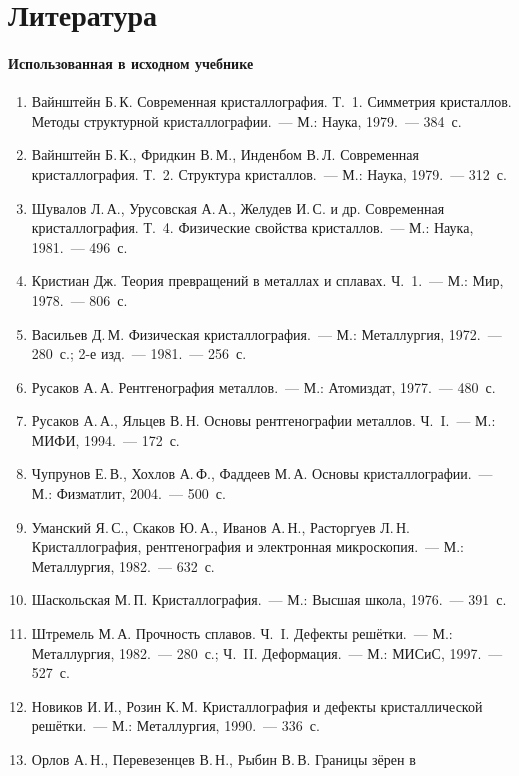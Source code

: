 \section*{Литература}

{\small
\paragraph{Использованная в исходном учебнике}
\begin{enumerate}[label=\arabic*.]
\item Вайнштейн Б.\,К. Современная кристаллография. Т.~1. Симметрия
кристаллов. Методы структурной кристаллографии.~— М.: Наука, 1979.~— 384~с.
\item Вайнштейн Б.\,К., Фридкин В.\,М., Инденбом В.\,Л. Современная
кристаллография. Т.~2. Структура кристаллов.~— М.: Наука, 1979.~— 312~с.
\item Шувалов Л.\,А., Урусовская А.\,А., Желудев И.\,С. и др. Современная
кристаллография. Т.~4. Физические свойства кристаллов.~— М.: Наука,
1981.~— 496~с.
\item Кристиан Дж. Теория превращений в металлах и сплавах. Ч.~1.~— М.:
Мир, 1978.~— 806~с.
\item Васильев Д.\,М. Физическая кристаллография.~— М.: Металлургия,
1972.~— 280~с.; 2-е изд.~— 1981.~— 256~с.
\item Русаков А.\,А. Рентгенография металлов.~— М.: Атомиздат, 1977.~— 480~с.
\item Русаков А.\,А., Яльцев В.\,Н. Основы рентгенографии металлов. Ч.~I.~—
М.: МИФИ, 1994.~— 172~с.
\item Чупрунов Е.\,В., Хохлов А.\,Ф., Фаддеев М.\,А. Основы
кристаллографии.~— М.: Физматлит, 2004.~— 500~с.
\item Уманский Я.\,С., Скаков Ю.\,А., Иванов А.\,Н., Расторгуев Л.\,Н.
Кристаллография, рентгенография и электронная микроскопия.~— М.:
Металлургия, 1982.~— 632~с.
\item Шаскольская М.\,П. Кристаллография.~— М.: Высшая школа, 1976.~— 391~с.
\item Штремель М.\,А. Прочность сплавов. Ч.~I. Дефекты решётки.~— М.:
Металлургия, 1982.~— 280~с.; Ч.~II. Деформация.~— М.: МИСиС, 1997.~— 527~с.
\item Новиков И.\,И., Розин К.\,М. Кристаллография и дефекты
кристаллической решётки.~— М.: Металлургия, 1990.~— 336~с.
\item Орлов А.\,Н., Перевезенцев В.\,Н., Рыбин В.\,В. Границы зёрен в

\end{enumerate}}

